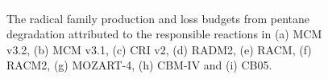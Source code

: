 
\begin{figure}
    \begin{center}
        \includegraphics[width=\textwidth]{img/pentane_radicals_budget_reactions}
        \caption{The radical family production and loss budgets from pentane degradation attributed to the responsible reactions in (a) MCM v3.2, (b) MCM v3.1, (c) CRI v2, (d) RADM2, (e) RACM, (f) RACM2, (g) MOZART-4, (h) CBM-IV and (i) CB05.}
        \label{f:pentane_radical}
    \end{center}
\end{figure} 


